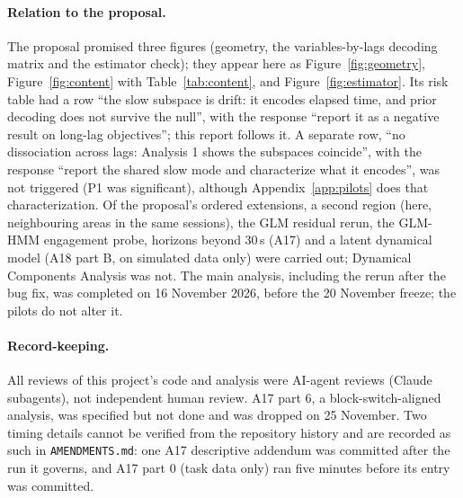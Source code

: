 \documentclass{article}
\begin{document}
\paragraph{Relation to the proposal.} The proposal promised three figures (geometry, the variables-by-lags decoding
matrix and the estimator check); they appear here as Figure~\ref{fig:geometry}, Figure~\ref{fig:content} with
Table~\ref{tab:content}, and Figure~\ref{fig:estimator}. Its risk table had a row ``the slow subspace is drift: it
encodes elapsed time, and prior decoding does not survive the null'', with the response ``report it as a negative
result on long-lag objectives''; this report follows it. A separate row, ``no dissociation across lags: Analysis 1 shows
the subspaces coincide'', with the response ``report the shared slow mode and characterize what it encodes'', was not
triggered (P1 was significant), although Appendix~\ref{app:pilots} does that characterization. Of the proposal's
ordered extensions, a second region (here, neighbouring areas in the same sessions), the GLM residual rerun, the
GLM-HMM engagement probe, horizons beyond 30\,s (A17) and a latent dynamical model (A18 part B, on simulated data
only) were carried out; Dynamical Components Analysis was not. The main analysis, including the rerun after the bug fix, was completed on
16 November 2026, before the 20 November freeze; the pilots do not alter it.

\paragraph{Record-keeping.} All reviews of this project's code and analysis were AI-agent reviews (Claude
subagents), not independent human review. A17 part 6, a block-switch-aligned analysis, was specified but not done
and was dropped on 25 November. Two timing details cannot be verified from the repository history and are recorded
as such in \texttt{AMENDMENTS.md}: one A17 descriptive addendum was committed after the run it governs, and A17 part 0
(task data only) ran five minutes before its entry was committed.
\end{document}
